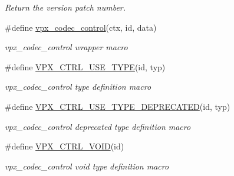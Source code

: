 \begin{DoxyCompactItemize}
\begin{DoxyCompactList}\small\item\em \-Return the version patch number. \end{DoxyCompactList}\item 
\#define \hyperlink{group__codec_gac1b91e04698c1bd4c0a2b8aa85b08cd2}{vpx\-\_\-codec\-\_\-control}(ctx, id, data)
\begin{DoxyCompactList}\small\item\em vpx\-\_\-codec\-\_\-control wrapper macro \end{DoxyCompactList}\item 
\#define \hyperlink{group__codec_gaa7409a4cb58b155912f41a4d39d81a8a}{\-V\-P\-X\-\_\-\-C\-T\-R\-L\-\_\-\-U\-S\-E\-\_\-\-T\-Y\-P\-E}(id, typ)
\begin{DoxyCompactList}\small\item\em vpx\-\_\-codec\-\_\-control type definition macro \end{DoxyCompactList}\item 
\#define \hyperlink{group__codec_ga147463efbdbe3b9823e054fe2d56851b}{\-V\-P\-X\-\_\-\-C\-T\-R\-L\-\_\-\-U\-S\-E\-\_\-\-T\-Y\-P\-E\-\_\-\-D\-E\-P\-R\-E\-C\-A\-T\-E\-D}(id, typ)
\begin{DoxyCompactList}\small\item\em vpx\-\_\-codec\-\_\-control deprecated type definition macro \end{DoxyCompactList}\item 
\#define \hyperlink{group__codec_ga2610354d13efd9ca04fb95823aeda773}{\-V\-P\-X\-\_\-\-C\-T\-R\-L\-\_\-\-V\-O\-I\-D}(id)
\begin{DoxyCompactList}\small\item\em vpx\-\_\-codec\-\_\-control void type definition macro \end{DoxyCompactList}\end{DoxyCompactItemize}
